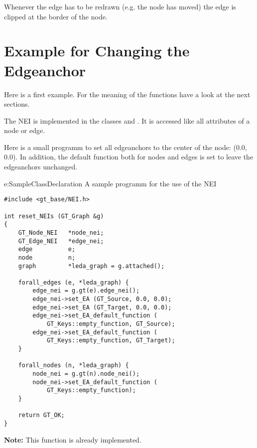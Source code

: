 \documentclass[twoside,fleqn]{report}
\begin{document}
Whenever the edge has to be redrawn (e.g. the node has moved) the edge is
clipped at the border of the node.


\section{Example for Changing the Edgeanchor}
\label{example_NEI}

Here is a first example. For the meaning of the functions have a look at 
the next sections.

The NEI is implemented in the classes 
 and . It is
accessed like all attributes of a node or edge.
 
Here is a small programm to set all edgeanchors to the center of the
node: (0.0, 0.0). 
In addition, the default function both for nodes and edges is set to leave 
the edgeanchors unchanged.

\begin{example}{e:SampleClassDeclaration}%
{A sample programm for the use of the NEI}
\begin{verbatim}
#include <gt_base/NEI.h>

int reset_NEIs (GT_Graph &g)
{
    GT_Node_NEI   *node_nei;
    GT_Edge_NEI   *edge_nei;
    edge          e;
    node          n;
    graph         *leda_graph = g.attached();

    forall_edges (e, *leda_graph) {
        edge_nei = g.gt(e).edge_nei();
        edge_nei->set_EA (GT_Source, 0.0, 0.0);
        edge_nei->set_EA (GT_Target, 0.0, 0.0);
        edge_nei->set_EA_default_function (
            GT_Keys::empty_function, GT_Source);
        edge_nei->set_EA_default_function (
            GT_Keys::empty_function, GT_Target);
    }

    forall_nodes (n, *leda_graph) {
        node_nei = g.gt(n).node_nei();
        node_nei->set_EA_default_function (
            GT_Keys::empty_function);
    }

    return GT_OK;
}

\end{verbatim}
\end{example}

\textbf{Note:} This function is already implemented.

\end{document}
